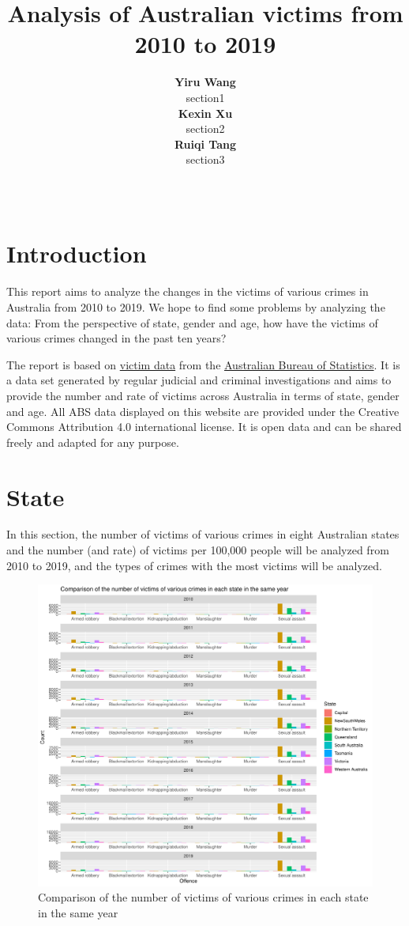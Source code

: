 \documentclass[11pt,a4paper,]{article}
\title{Analysis of Australian victims from 2010 to 2019}
\author{\sf\Large\textbf{ Yiru Wang}\\ {\sf\large section1\\[0.5cm]} \sf\Large\textbf{ Kexin Xu}\\ {\sf\large section2\\[0.5cm]} \sf\Large\textbf{ Ruiqi Tang}\\ {\sf\large section3\\[0.5cm]}}
\date{\sf\Date~\Month~\Year}
\makeatletter
\def\titlepage{\front{\expandafter{\@title}}{\@author}{\@organization}}
\makeatother
\begin{document}
\titlepage

\clearpage

\section*{Introduction}

This report aims to analyze the changes in the victims of various crimes in Australia from 2010 to 2019. We hope to find some problems by analyzing the data: From the perspective of state, gender and age, how have the victims of various crimes changed in the past ten years?

The report is based on \href{https://www.abs.gov.au/statistics/people/crime-and-justice/recorded-crime-victims/latest-release}{victim data} from the \href{https://www.abs.gov.au/}{Australian Bureau of Statistics}. It is a data set generated by regular judicial and criminal investigations and aims to provide the number and rate of victims across Australia in terms of state, gender and age. All ABS data displayed on this website are provided under the Creative Commons Attribution 4.0 international license. It is open data and can be shared freely and adapted for any purpose.

\clearpage

\section*{State}

In this section, the number of victims of various crimes in eight Australian states and the number (and rate) of victims per 100,000 people will be analyzed from 2010 to 2019, and the types of crimes with the most victims will be analyzed.

\begin{figure}
\centering
\includegraphics{report_files/figure-latex/plot1-1.pdf}
\caption{\label{fig:plot1}Comparison of the number of victims of various crimes in each state in the same year}
\end{figure}
\end{document}
